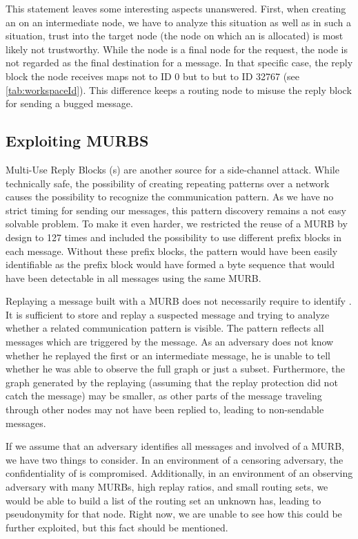 This statement leaves some interesting aspects unanswered. First, when creating an  on an intermediate node, we have to analyze this situation as well as in such a situation, trust into the target node (the node on which an  is allocated) is most likely not trustworthy. While the node is a final node for the request, the node is not regarded as the final destination for a message. In that specific case, the reply block the node receives maps not to ID 0 but to but to ID 32767 (see \cref{tab:workspaceId}). This difference keeps a routing node to misuse the reply block for sending a bugged message.

\subsection{Exploiting MURBS}
Multi-Use Reply Blocks (s) are another source for a side-channel attack. While technically safe, the possibility of creating repeating patterns over a network causes the possibility to recognize the communication pattern. As we have no strict timing for sending our messages, this pattern discovery remains a not easy solvable problem. To make it even harder, we restricted the reuse of a MURB by design to 127 times and included the possibility to use different prefix blocks in each message. Without these prefix blocks, the pattern would have been easily identifiable as the prefix block would have formed a byte sequence that would have been detectable in all messages using the same MURB.

Replaying a message built with a MURB does not necessarily require to identify \VortexMessages{}. It is sufficient to store and replay a suspected message and trying to analyze whether a related communication pattern is visible. The pattern reflects all messages which are triggered by the message. As an adversary does not know whether he replayed the first or an intermediate message, he is unable to tell whether he was able to observe the full graph or just a subset. Furthermore, the graph generated by the replaying (assuming that the replay protection did not catch the message) may be smaller, as other parts of the message traveling through other nodes may not have been replied to, leading to non-sendable messages.

If we assume that an adversary identifies all messages and involved \VortexNodes{} of a MURB, we have two things to consider. In an environment of a censoring adversary, the confidentiality of \VortexNodes{} is compromised. Additionally, in an environment of an observing adversary with many MURBs, high replay ratios, and small routing sets, we would be able to build a list of the routing set an unknown \VortexNode{} has, leading to pseudonymity for that node. Right now, we are unable to see how this could be further exploited, but this fact should be mentioned. 

